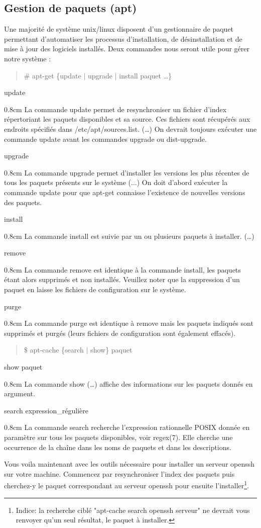 \documentclass[a4paper]{article}
\newcommand{\commande}[1] {
    \begin{quote}
    \tt\raggedright #1 
    \end{quote}
}
\newcommand{\man}[2]{
    \begin{tcolorbox}[toprule=3mm,width=\textwidth,outer arc=0mm,colbacktitle=grayman,coltitle=black,colback={grayman},colframe={grayman},title={man : \tt #1}]
        \tt\raggedright #2
    \end{tcolorbox}
}
\newcommand{\mandesc}[1]{
    \begin{adjustwidth}{0.8cm}{}
        #1
    \end{adjustwidth}
}
\begin{document}
\subsection{Gestion de paquets (apt)}
\par Une majorité de système unix/linux disposent d'un gestionnaire de paquet permettant d'automatiser les processus d'installation, de désinstallation et de mise à jour des logiciels installés. Deux commandes nous seront utile pour gérer notre système :
\commande{\# apt-get \{update $|$ upgrade $|$ install paquet \ldots\}}
\man{apt-get}{
update
\mandesc{La commande update permet de resynchroniser un fichier d'index répertoriant les paquets disponibles et sa source. Ces fichiers sont récupérés aux endroits spécifiés dans /etc/apt/sources.list. (\ldots) On devrait toujours exécuter une commande update avant les commandes upgrade ou dist-upgrade.}
upgrade
\mandesc{La commande upgrade permet d'installer les versions les plus récentes de tous les paquets présents sur le système (...) On doit d'abord exécuter la commande update pour que apt-get connaisse l'existence de nouvelles versions des paquets.}
install
\mandesc{La commande install est suivie par un ou plusieurs paquets à installer. (\ldots)}
remove
\mandesc{La commande remove est identique à la commande install, les paquets étant alors supprimés et non installés. Veuillez noter que la suppression d'un paquet en laisse les fichiers de configuration sur le système.}
purge
\mandesc{La commande purge est identique à remove mais les paquets indiqués sont supprimés et purgés (leurs fichiers de configuration sont également effacés).}
}
\commande{\$ apt-cache \{search $|$ show\} paquet}
\man{apt-cache}{
show paquet
\mandesc{La commande show (\dots) affiche des informations sur les paquets donnés en argument.}
search expression\_régulière
\mandesc{La commande search recherche l'expression rationnelle POSIX donnée en paramètre sur tous les paquets disponibles, voir regex(7). Elle cherche une occurrence de la chaîne dans les noms de paquets et dans les descriptions.}
}
\par Vous voila maintenant avec les outils nécessaire pour installer un serveur openssh sur votre machine. Commencez par resynchroniser l'index des paquets puis cherchez-y le paquet correspondant au serveur openssh pour ensuite l'installer\footnote{Indice: la recherche ciblé "apt-cache search openssh serveur" ne devrait vous renvoyer qu'un seul résultat, le paquet à installer.}.
\end{document}

